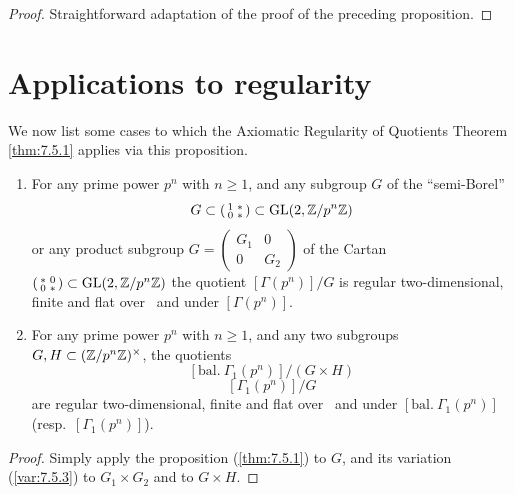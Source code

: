\begin{proof}
Straightforward adaptation of the proof of the preceding proposition.
\end{proof}

\section{Applications to regularity}
\label{sec:7.6}

We now list some cases to which the Axiomatic Regularity of Quotients Theorem \ref{thm:7.5.1} applies via this proposition.

\begin{kthm}\label{thm:7.6.1}
\begin{enumerate}[(1)]
\item For any prime power $p^n$ with $n \geq 1$, and any subgroup $G$ of the ``semi-Borel''
\[
G \subset \left(\begin{smallmatrix} 1 & * \\ 0 & * \end{smallmatrix}\right) \subset \operatorname{GL}(2,\mathbb{Z}/p^n\mathbb{Z})
\]
or any product subgroup $G = \left(\begin{smallmatrix} G_1 & 0 \\ 0 & G_2 \end{smallmatrix}\right)$ of the Cartan $\left(\begin{smallmatrix} * & 0 \\ 0 & * \end{smallmatrix}\right) \subset \operatorname{GL}(2,\mathbb{Z}/p^n\mathbb{Z})$
the quotient $[\Gamma(p^n)]/G$ is regular two-dimensional, finite and flat over \Ell\ and under $[\Gamma(p^n)]$.
\item For any prime power $p^n$ with $n \geq 1$, and any two subgroups $G, H \subset (\mathbb{Z}/p^n\mathbb{Z})^\times$, the quotients
\[
[\mathrm{bal.}\ \Gamma_1(p^n)]/(G \times H)
\]
\[
[\Gamma_1(p^n)]/G
\]
are regular two-dimensional, finite and flat over \Ell\ and under $[\mathrm{bal.}\ \Gamma_1(p^n)]$ (resp.\ $[\Gamma_1(p^n)]$).
\end{enumerate}
\end{kthm}

\begin{proof}
Simply apply the proposition (\ref{thm:7.5.1}) to $G$, and its variation (\ref{var:7.5.3}) to $G_1 \times G_2$ and to $G \times H$.
\end{proof}

